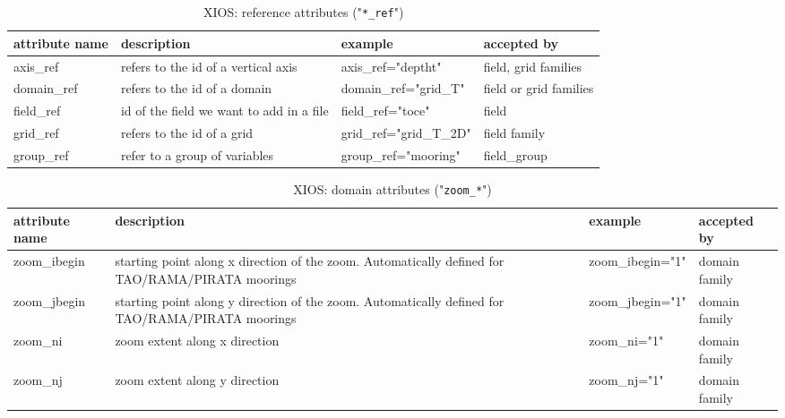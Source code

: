 \documentclass[../main/NEMO_manual]{subfiles}
\begin{document}
\begin{table}
  \begin{tabularx}{\textwidth}{|l|X|l|l|}
    \hline
    attribute name                           &
    description                              &
    example                                  &
    accepted by            \\
    \hline
    \hline
    axis\_ref                                &
    refers to the id of a vertical axis      &
    axis\_ref="deptht"                       &
    field, grid families   \\
    \hline
    domain\_ref                              &
    refers to the id of a domain             &
    domain\_ref="grid\_T"                    &
    field or grid families \\
    \hline
    field\_ref                               &
    id of the field we want to add in a file &
    field\_ref="toce"                        &
    field                  \\
    \hline
    grid\_ref                                &
    refers to the id of a grid               &
    grid\_ref="grid\_T\_2D"                  &
    field family           \\
    \hline
    group\_ref                               &
    refer to a group of variables            &
    group\_ref="mooring"                     &
    field\_group           \\
    \hline
  \end{tabularx}
  \caption{XIOS: reference attributes ("\texttt{*\_ref}")}
\end{table}

\begin{table}
  \begin{tabularx}{\textwidth}{|l|X|l|l|}
    \hline
    attribute name                                     &
    description                                        &
    example                                            &
    accepted by   \\
    \hline
    \hline
    zoom\_ibegin                                       &
    starting point along x direction of the zoom.
    Automatically defined for TAO/RAMA/PIRATA moorings &
    zoom\_ibegin="1"                                   &
    domain family \\
    \hline
    zoom\_jbegin                                       &
    starting point along y direction of the zoom.
    Automatically defined for TAO/RAMA/PIRATA moorings &
    zoom\_jbegin="1"                                   &
    domain family \\
    \hline
    zoom\_ni                                           &
    zoom extent along x direction                      &
    zoom\_ni="1"                                       &
    domain family \\
    \hline
    zoom\_nj                                           &
    zoom extent along y direction                      &
    zoom\_nj="1"                                       &
    domain family \\
    \hline
  \end{tabularx}
  \caption{XIOS: domain attributes ("\texttt{zoom\_*}")}
\end{table}
\end{document}
